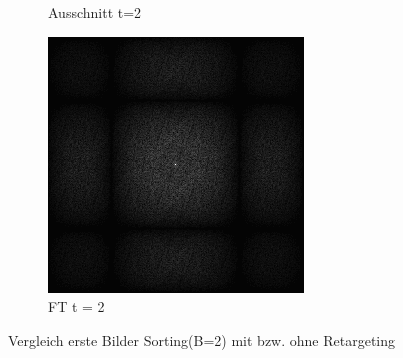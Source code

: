 \begin{figure}[H]
\begin{subfigure}[b]{0.2\linewidth}
         \caption{Ausschnitt t=2}
         \label{pic:retarget_screen_t2}
    \end{subfigure}
    \begin{subfigure}[b]{0.2\linewidth}
        \includegraphics[width=\linewidth]{content/TemporalerAlg/Bilder/Retargeting/Bedeutung Retargeting/Sorting_Small_Block_WithRetargeting/Spektrum/Ausschnitt3.png}
         \caption{FT t = 2}
         \label{pic:retarget_t2}
    \end{subfigure}
    \caption{Vergleich erste Bilder Sorting(B=2) mit bzw. ohne Retargeting}
    \label{fig:VergleichRetargetSorting}
      
\end{figure}

